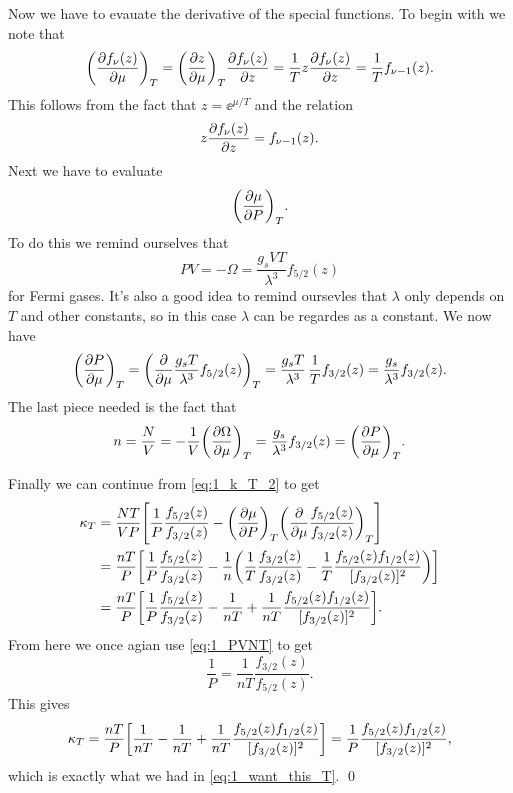 \documentclass[11pt,letter, swedish, english
]{article}
\begin{document}
Now we have to evauate the derivative of the special functions. To
begin with we note that
\begin{equation}
\qty(\pdv{f_\nu(z)}{\mu})_T=\qty(\pdv{z}{\mu})_T\pdv{f_\nu(z)}{z}
= \frac{1}{T}z\pdv{f_\nu(z)}{z}=\frac{1}{T}f_{\nu-1}(z).
\end{equation}
This follows from the fact that $z=\ee^{\mu/T}$ and the relation
\begin{equation}
z\pdv{f_\nu(z)}{z} = f_{\nu-1}(z).
\end{equation}
Next we have to evaluate
\begin{equation}
\qty(\pdv{\mu}{P})_T.
\end{equation}
To do this we remind ourselves that
\begin{equation}
PV=-\Omega=\frac{g_sVT}{\lambda^3}f_{5/2}(z)
\end{equation}
for Fermi gases. It's also a good idea to remind oursevles that
$\lambda$ only depends on $T$ and other constants, so in this case
$\lambda$ can be regardes as a constant. We now have
\begin{equation}
\qty(\pdv{P}{\mu})_T 
=\qty(\pdv{\mu} \frac{g_sT}{\lambda^3}f_{5/2}(z))_T 
=\frac{g_sT}{\lambda^3} \,\frac{1}{T}f_{3/2}(z) 
=\frac{g_s}{\lambda^3} f_{3/2}(z).
\end{equation}
The last piece needed is the fact that
\begin{equation}
n=\frac{N}{V}=-\frac{1}{V}\qty(\pdv{\Omega}{\mu})_T
=\frac{g_s}{\lambda^3} f_{3/2}(z)=\qty(\pdv{P}{\mu})_T.
\end{equation}

Finally we can continue from \eqref{eq:1_k_T_2} to get
\begin{equation}
\begin{aligned}
\kappa_T &= \frac{NT}{VP} \qty[
\frac{1}{P}\frac{f_{5/2}(z)}{f_{3/2}(z)}
-\qty(\pdv{\mu}{P})_T\qty(\pdv{\mu}\frac{f_{5/2}(z)}{f_{3/2}(z)})_T
]\\
&= \frac{nT}{P} \qty[
\frac{1}{P}\frac{f_{5/2}(z)}{f_{3/2}(z)}
-\frac{1}{n}\qty(\frac{1}{T}\frac{f_{3/2}(z)}{f_{3/2}(z)}
-\frac{1}{T}\frac{f_{5/2}(z)f_{1/2}(z)}{[f_{3/2}(z)]^2}
)]\\
&= \frac{nT}{P} \qty[
\frac{1}{P}\frac{f_{5/2}(z)}{f_{3/2}(z)}
-\frac{1}{nT}
+\frac{1}{nT}\frac{f_{5/2}(z)f_{1/2}(z)}{[f_{3/2}(z)]^2}
].
\end{aligned}
\end{equation}
From here we once agian use \eqref{eq:1_PVNT} to get
\begin{equation}
\frac{1}{P}=\frac{1}{nT}\frac{f_{3/2}(z)}{f_{5/2}(z)}.
\end{equation}
This gives
\begin{equation}
\kappa_T = \frac{nT}{P} \qty[
\frac{1}{nT}
-\frac{1}{nT}
+\frac{1}{nT}\frac{f_{5/2}(z)f_{1/2}(z)}{[f_{3/2}(z)]^2}
]
=\frac{1}{P}\frac{f_{5/2}(z)f_{1/2}(z)}{[f_{3/2}(z)]^2},
\end{equation}
which is exactly what we had in \eqref{eq:1_want_this_T}.
\qed
\end{document}
